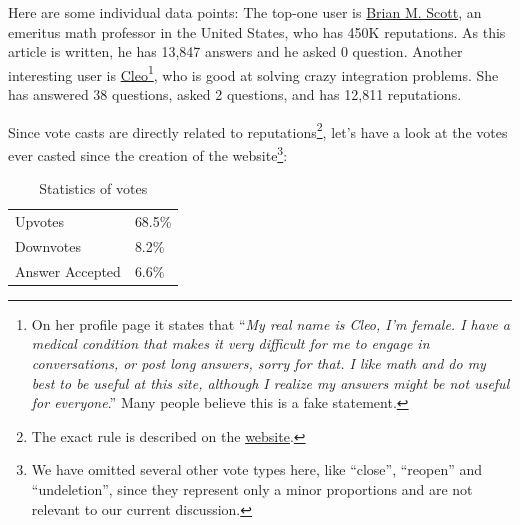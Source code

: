 \documentclass[12pt]{article}
\begin{document}
Here are some individual data points: The top-one user is \href{https://math.stackexchange.com/users/12042/brian-m-scott}{Brian M. Scott}, an emeritus math professor in the United States, who has 450K reputations. As this article is written, he has 13,847 answers and he asked 0 question. Another interesting user is \href{https://math.stackexchange.com/users/97378/cleo}{Cleo}\footnote{On her profile page it states that ``\emph{My real name is Cleo, I'm female. I have a medical condition that makes it very difficult for me to engage in conversations, or post long answers, sorry for that. I like math and do my best to be useful at this site, although I realize my answers might be not useful for everyone}.'' Many people believe this is a fake statement.},  who is good at solving crazy integration problems. She has answered 38 questions, asked 2 questions, and has 12,811 reputations.

Since vote casts are directly related to reputations\footnote{The exact rule is described on the \href{https://math.stackexchange.com/help/whats-reputation}{website}.}, let's have a look at the votes ever casted since the creation of the website\footnote{We have omitted several other vote types here, like ``close'', ``reopen'' and ``undeletion'', since they represent only a minor proportions and are not relevant to our current discussion.}:
\begin{table}
\centering
\begin{tabu} to 0.7\textwidth{X[l] X[r]}
\toprule
Upvotes & 68.5\%\\
Downvotes & 8.2\%\\
Answer Accepted & 6.6\%\\ 
\bottomrule
\end{tabu}
\caption{Statistics of votes}
\label{votes}
\end{table}
\end{document}

